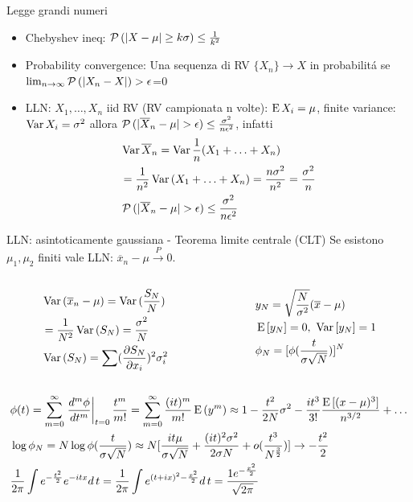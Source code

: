 \begin{frame}{Legge grandi numeri}
\begin{itemize}
\item Chebyshev ineq: $\prob{(|X-\mu|\geq k\sigma)}\leq\frac{1}{k^2}$
\item Probability convergence: 	Una sequenza di RV $\{X_n\}\to X$ in probabilit\'a se $\lim_{n\to\infty}\prob{(|X_n-X|)>\epsilon}$=0
\item LLN: $X_1,\ldots,X_n$ iid RV (RV campionata n volte): $\E{X_i}=\mu$, finite variance: $\var{X_i}=\sigma^2$ allora $\prob{(|\overline{X}_n-\mu|>\epsilon)}\leq\frac{\sigma^2}{n\epsilon^2}$, infatti
\begin{align*}
&\var{\overline{X}_n}=\var{\frac{1}{n}(X_1+\ldots+X_n)}\\
&=\frac{1}{n^2}\var{(X_1+\ldots+X_n)}=\frac{n\sigma^2}{n^2}=\frac{\sigma^2}{n}\\
&\prob{(|\overline{X}_n-\mu|>\epsilon)}\leq\frac{\sigma^2}{n\epsilon^2}
\end{align*}
\end{itemize}
\end{frame}

\begin{frame}{LLN: asintoticamente gaussiana - Teorema limite centrale (CLT)}
Se esistono $\mu_1, \mu_2$ finiti vale LLN: $\overline{x}_n-\mu\xrightarrow{P}0$.
\begin{columns}[T]
	\begin{column}{0.5\textwidth}
		\begin{align*}
		&\var{(\overline{x}_n-\mu)}=\var{(\frac{S_N}{N})}\\
		&=\frac{1}{N^2}\var{(S_N)}=\frac{\sigma^2}{N}\\
		&\var{(S_N)}=\sum(\PDy{x_i}{S_N})^2\sigma_i^2
		\end{align*}
	\end{column}
	\begin{column}{0.5\textwidth}
		\begin{align*}
		&y_N=\sqrt{\frac{N}{\sigma^2}}(\overline{x}-\mu)\\
		&\E{[y_N]}=0,\ \var{[y_N]}=1\\
		&\phi_N=[\phi(\frac{t}{\sigma\sqrt{N}})]^N
		\end{align*}
	\end{column}
\end{columns}
\begin{align*}
&\phi(t)=\sum_{m=0}^{\infty}\left.\frac{d^m\phi}{dt^m}\right|_{t=0}\frac{t^m}{m!}=\sum_{m=0}^{\infty}\frac{(it)^m}{m!}\E{(y^m)}\approx1-\frac{t^2}{2N}\sigma^2-\frac{it^3}{3!}\frac{\E{[(x-\mu)^3]}}{n\expy{3/2}}+\ldots\\
&\log{\phi_N}=N\log{\phi(\frac{t}{\sigma\sqrt{N}})}\approx N[\frac{it\mu}{\sigma\sqrt{N}}+\frac{(it)^2\sigma^2}{2\sigma N}+o(\frac{t^3}{N\expy{\frac{3}{2}}})]\to-\frac{t^2}{2}\\
&\frac{1}{2\pi}\int\exp{-\frac{t^2}{2}}\exp{-itx}d\,t=\frac{1}{2\pi}\int\exp{(t+ix)^2-\frac{x^2}{2}}d\,t=\frac{1\exp{-\frac{x^2}{2}}}{\sqrt{2\pi}}
\end{align*}
\end{frame}

